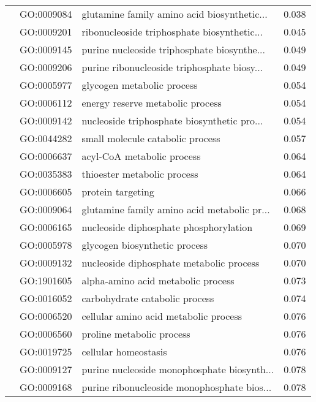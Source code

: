 \begin{longtable}{lllr}
   & GO:0009084 &  glutamine family amino acid biosynthetic... &         0.038 \\
   & GO:0009201 &  ribonucleoside triphosphate biosynthetic... &         0.045 \\
   & GO:0009145 &  purine nucleoside triphosphate biosynthe... &         0.049 \\
   & GO:0009206 &  purine ribonucleoside triphosphate biosy... &         0.049 \\
   & GO:0005977 &                   glycogen metabolic process &         0.054 \\
   & GO:0006112 &             energy reserve metabolic process &         0.054 \\
   & GO:0009142 &  nucleoside triphosphate biosynthetic pro... &         0.054 \\
   & GO:0044282 &             small molecule catabolic process &         0.057 \\
   & GO:0006637 &                   acyl-CoA metabolic process &         0.064 \\
   & GO:0035383 &                  thioester metabolic process &         0.064 \\
   & GO:0006605 &                            protein targeting &         0.066 \\
   & GO:0009064 &  glutamine family amino acid metabolic pr... &         0.068 \\
   & GO:0006165 &       nucleoside diphosphate phosphorylation &         0.069 \\
   & GO:0005978 &                glycogen biosynthetic process &         0.070 \\
   & GO:0009132 &     nucleoside diphosphate metabolic process &         0.070 \\
   & GO:1901605 &           alpha-amino acid metabolic process &         0.073 \\
   & GO:0016052 &               carbohydrate catabolic process &         0.074 \\
   & GO:0006520 &        cellular amino acid metabolic process &         0.076 \\
   & GO:0006560 &                    proline metabolic process &         0.076 \\
   & GO:0019725 &                         cellular homeostasis &         0.076 \\
   & GO:0009127 &  purine nucleoside monophosphate biosynth... &         0.078 \\
   & GO:0009168 &  purine ribonucleoside monophosphate bios... &         0.078 \\

\end{longtable}

